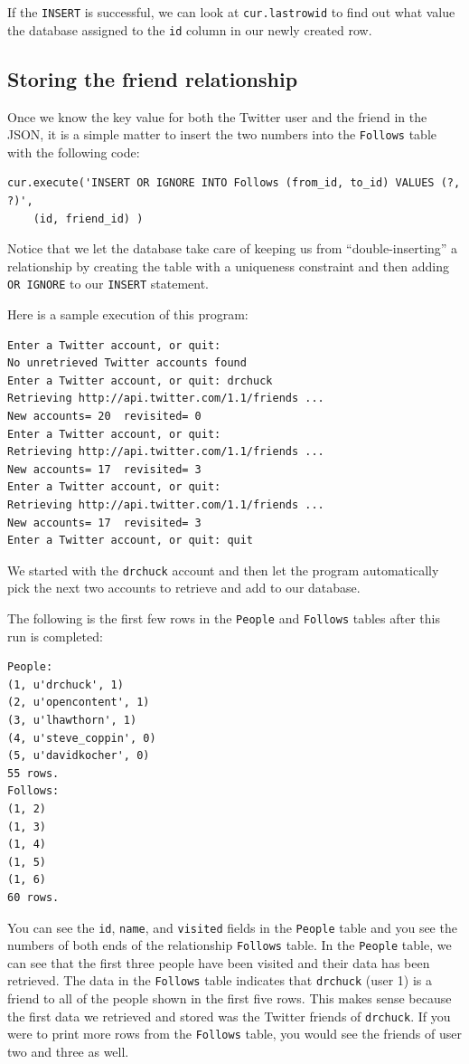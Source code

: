 \documentclass[11pt]{book}
\begin{document}
If the {\tt INSERT} is successful, we can look at {\tt cur.lastrowid} 
to find out what value the database assigned to the {\tt id} column in 
our newly created row.

\subsection{Storing the friend relationship}

Once we know the key value for both the Twitter user
and the friend in the JSON, it is a simple matter to insert
the two numbers into the {\tt Follows} table
with the following code:

\beforeverb
\begin{verbatim}
cur.execute('INSERT OR IGNORE INTO Follows (from_id, to_id) VALUES (?, ?)',
    (id, friend_id) )
\end{verbatim}
\afterverb
%
Notice that we let the database take care of keeping us from ``double-inserting''
a relationship by creating the table with a uniqueness constraint and then
adding {\tt OR IGNORE} to our {\tt INSERT} statement.

Here is a sample execution of this program:

\beforeverb
\begin{verbatim}
Enter a Twitter account, or quit: 
No unretrieved Twitter accounts found
Enter a Twitter account, or quit: drchuck
Retrieving http://api.twitter.com/1.1/friends ...
New accounts= 20  revisited= 0
Enter a Twitter account, or quit: 
Retrieving http://api.twitter.com/1.1/friends ...
New accounts= 17  revisited= 3
Enter a Twitter account, or quit: 
Retrieving http://api.twitter.com/1.1/friends ...
New accounts= 17  revisited= 3
Enter a Twitter account, or quit: quit
\end{verbatim}
\afterverb
%
We started with the {\tt drchuck} account and then let the program
automatically pick the next two accounts to retrieve and add to 
our database.

The following is the first few rows in the {\tt People} 
and {\tt Follows} tables after this run is completed:

\beforeverb
\begin{verbatim}
People:
(1, u'drchuck', 1)
(2, u'opencontent', 1)
(3, u'lhawthorn', 1)
(4, u'steve_coppin', 0)
(5, u'davidkocher', 0)
55 rows.
Follows:
(1, 2)
(1, 3)
(1, 4)
(1, 5)
(1, 6)
60 rows.
\end{verbatim}
\afterverb
%
You can see the {\tt id}, {\tt name}, and {\tt visited} fields in the 
{\tt People} table and you see the numbers of both ends of 
the relationship {\tt Follows} table.   
In the {\tt People} table, we can see that the first three people
have been visited and their data has been retrieved.
The data in the {\tt Follows} table indicates that
{\tt drchuck} (user 1) is a friend to all of the people shown in the first
five rows.  This makes sense because
the first data we retrieved and stored was the Twitter friends of
{\tt drchuck}.  If you were to print more rows from the {\tt Follows} table,
you would see the friends of user two and three as well.
\end{document}
